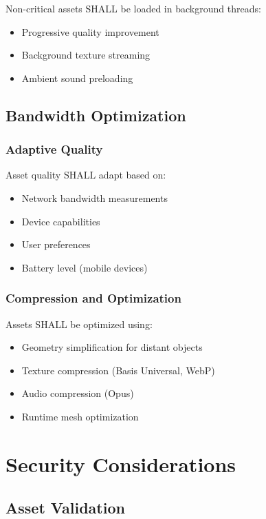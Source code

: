 \documentclass[12pt,a4paper]{article}
\begin{document}
Non-critical assets SHALL be loaded in background threads:

\begin{itemize}
\item Progressive quality improvement
\item Background texture streaming
\item Ambient sound preloading
\end{itemize}

\subsection{Bandwidth Optimization}

\subsubsection{Adaptive Quality}

Asset quality SHALL adapt based on:

\begin{itemize}
\item Network bandwidth measurements
\item Device capabilities
\item User preferences
\item Battery level (mobile devices)
\end{itemize}

\subsubsection{Compression and Optimization}

Assets SHALL be optimized using:

\begin{itemize}
\item Geometry simplification for distant objects
\item Texture compression (Basis Universal, WebP)
\item Audio compression (Opus)
\item Runtime mesh optimization
\end{itemize}

\section{Security Considerations}

\subsection{Asset Validation}
\end{document}
